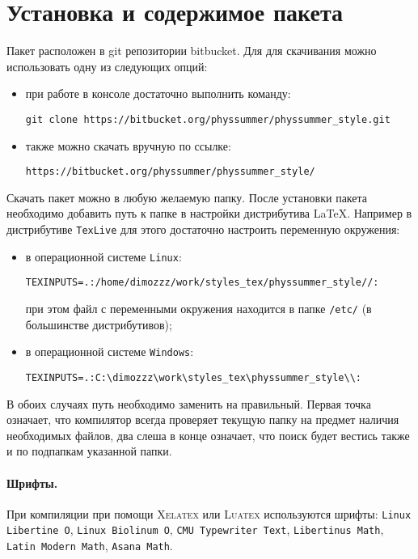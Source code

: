 \section{Установка и содержимое пакета}

Пакет расположен в git репозитории bitbucket. Для для скачивания можно использовать одну из следующих
опций:
\begin{itemize}
    \item при работе в консоле достаточно выполнить команду:
        \begin{lstlisting}[gobble = 7, keepspaces = \false]
            git clone https://bitbucket.org/physsummer/physsummer_style.git
        \end{lstlisting}
    \item также можно скачать вручную по ссылке:
        \begin{lstlisting}[gobble = 7, keepspaces = \false]
            https://bitbucket.org/physsummer/physsummer_style/
        \end{lstlisting}
\end{itemize}


Скачать пакет можно в любую желаемую папку. После установки пакета необходимо добавить путь к папке в
настройки дистрибутива \LaTeX. Например в дистрибутиве \texttt{TexLive} для этого достаточно настроить
переменную окружения:

\begin{itemize}
    \item в операционной системе \texttt{Linux}:
        \begin{lstlisting}[gobble = 7, keepspaces = \false]
            TEXINPUTS=.:/home/dimozzz/work/styles_tex/physsummer_style//:
        \end{lstlisting}
        при этом файл с переменными окружения находится в папке \texttt{/etc/} (в большинстве дистрибутивов);
    \item в операционной системе \texttt{Windows}:
        \begin{lstlisting}[gobble = 7, keepspaces = \false]
            TEXINPUTS=.:C:\dimozzz\work\styles_tex\physsummer_style\\:
        \end{lstlisting}
\end{itemize}

В обоих случаях путь необходимо заменить на правильный. Первая точка означает, что компилятор всегда
проверяет текущую папку на предмет наличия необходимых файлов, два слеша в конце означает, что поиск
будет вестись также и по подпапкам указанной папки.

\paragraph{Шрифты.} При компиляции при помощи \textsc{Xelatex} или \textsc{Luatex} используются шрифты:
\texttt{Linux Libertine O}, \texttt{Linux Biolinum O}, \texttt{CMU Typewriter Text},
\texttt{Libertinus Math}, \texttt{Latin Modern Math}, \texttt{Asana Math}.